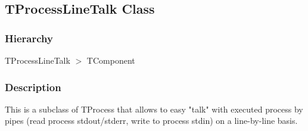 \documentclass{report}
\begin{document}
\subsection*{TProcessLineTalk Class}
\fi
\label{PasDoc_ProcessLineTalk.TProcessLineTalk}
\subsubsection*{\large{\textbf{Hierarchy}}\normalsize\hspace{1ex}\hfill}
TProcessLineTalk {$>$} TComponent
\subsubsection*{\large{\textbf{Description}}\normalsize\hspace{1ex}\hfill}
This is a subclass of TProcess that allows to easy "talk" with executed process by pipes (read process stdout/stderr, write to process stdin) on a line{-}by{-}line basis.
\end{document}
